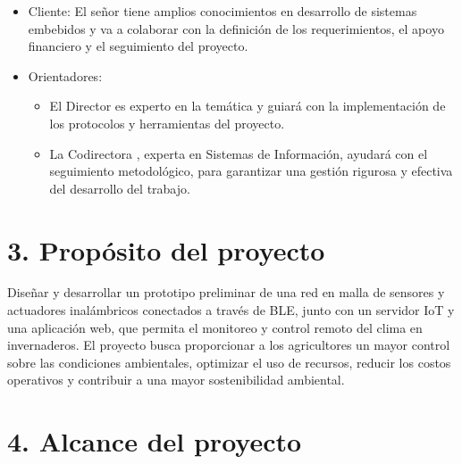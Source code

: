 \documentclass[
11pt, %
codirector, %
]{charter}
\begin{document}
\begin{itemize}
	\item Cliente: El señor \clientename\hspace{1px} tiene amplios conocimientos en
	      desarrollo de sistemas embebidos y va a colaborar con la definición de los
	      requerimientos, el apoyo financiero y el seguimiento del proyecto.
	\item Orientadores:
	      \begin{itemize}
		      \item El Director \supname\hspace{1px} es experto en la temática y guiará con la
		            implementación de los protocolos y herramientas del proyecto.
		      \item La Codirectora \cosupname , experta en Sistemas de Información, ayudará con el
		            seguimiento metodológico, para garantizar una gestión rigurosa y efectiva del
		            desarrollo del trabajo.
	      \end{itemize}
\end{itemize}

\section{3. Propósito del proyecto}
\label{sec:proposito}

Diseñar y desarrollar un prototipo preliminar de una red en malla de sensores y
actuadores inalámbricos conectados a través de BLE, junto con un servidor IoT y
una aplicación web, que permita el monitoreo y control remoto del clima en
invernaderos. El proyecto busca proporcionar a los agricultores un mayor
control sobre las condiciones ambientales, optimizar el uso de recursos,
reducir los costos operativos y contribuir a una mayor sostenibilidad
ambiental.

\section{4. Alcance del proyecto}
\label{sec:alcance}
\end{document}
